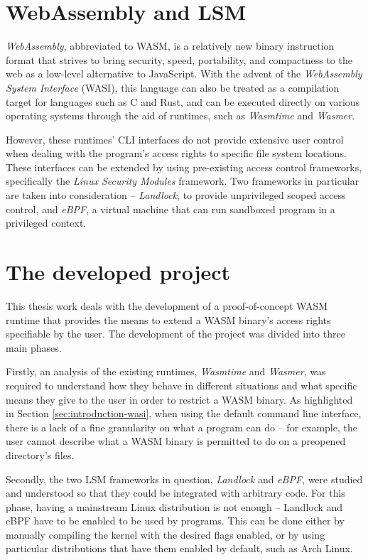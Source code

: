 \section{WebAssembly and LSM}

\textit{WebAssembly}, abbreviated to WASM, is a relatively new binary instruction format that
strives to bring security, speed, portability, and compactness to the web
as a low-level alternative to JavaScript.
With the advent of the \textit{WebAssembly System Interface} (WASI),
this language can also be treated as a compilation target for languages such as C and Rust,
and can be executed directly on various operating systems
through the aid of runtimes, such as \textit{Wasmtime} and \textit{Wasmer}.

However, these runtimes' CLI interfaces do not provide extensive user control
when dealing with the program's access rights to specific file system locations.
These interfaces can be extended by using pre-existing access control frameworks,
specifically the \textit{Linux Security Modules} framework.
Two frameworks in particular are taken into consideration -- \textit{Landlock},
to provide unprivileged scoped access control, and \textit{eBPF}, a virtual
machine that can run sandboxed program in a privileged context.

\section{The developed project}

This thesis work deals with the development of a proof-of-concept WASM runtime that
provides the means to extend a WASM binary's access rights specifiable by the user.
The development of the project was divided into three main phases.

Firstly, an analysis of the existing runtimes, \textit{Wasmtime} and \textit{Wasmer},
was required to understand how they behave in different situations and what
specific means they give to the user in order to restrict a WASM binary.
As highlighted in Section \ref{sec:introduction-wasi}, when using the default command line
interface, there is a lack of a fine granularity on what a program can do -- for example,
the user cannot describe what a WASM binary is permitted to do on a preopened directory's files.

Secondly, the two LSM frameworks in question, \textit{Landlock} and \textit{eBPF}, were studied and understood
so that they could be integrated with arbitrary code.
For this phase, having a mainstream Linux distribution is not enough -- Landlock and eBPF have to be enabled
to be used by programs. This can be done either by manually compiling the kernel with the desired
flags enabled, or by using particular distributions that have them enabled by default, such as Arch Linux.

